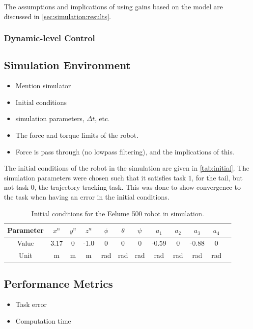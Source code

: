 The assumptions and implications of using gains based on the model are discussed
in \autoref{sec:simulation:results}.

\subsubsection{Dynamic-level Control}

\subsection{Simulation Environment}
\begin{itemize}
    \item Mention simulator
    \item Initial conditions
    \item simulation parameters, $\Delta t$, etc.
    \item The force and torque limits of the robot.
    \item Force is pass through (no lowpass filtering), and the implications of
        this.
\end{itemize}

The initial conditions of the robot in the simulation are given in \autoref{tab:initial}.
The simulation parameters were chosen such that it satisfies task $1$, for the tail,
but not task $0$, the trajectory tracking task. This was done to show convergence
to the task when having an error in the initial conditions.
\begin{table}[h!]
    \centering
    \begin{tabular}{|c|c|c|c|c|c|c|c|c|c|c|c|}
        \hline
        Parameter & $x^n$ & $y^n$ & $z^n$ & $\phi$ & $\theta$ & $\psi$ & $a_1$ & $a_2$ & $a_3$ & $a_4$ \\ \hline
        Value & 3.17 & 0 & -1.0 & 0 & 0 & 0 & -0.59 & 0 & -0.88 & 0 \\ \hline
        Unit & m & m & m & rad & rad & rad & rad & rad & rad & rad \\
        \hline
    \end{tabular}
    \caption{Initial conditions for the Eelume 500 robot in simulation.}
    \label{tab:initial}
\end{table}

\subsection{Performance Metrics}
\begin{itemize}
    \item Task error
    \item Computation time
\end{itemize}

